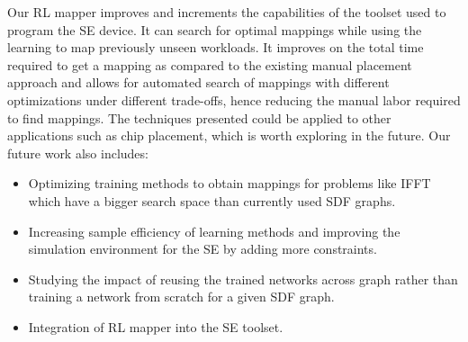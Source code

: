 Our RL mapper improves and increments the capabilities of the toolset used to program the SE device. 
It can search for optimal mappings while using the learning to map previously unseen workloads. 
It improves on the total time required to get a mapping as compared to the existing manual placement approach and allows for automated search of mappings with different optimizations under different trade-offs, hence reducing the manual labor required to find mappings. 
The techniques presented could be applied to other applications such as chip placement, which is worth exploring in the future. 
Our future work also includes: 
\begin{itemize}
    \item Optimizing training methods to obtain mappings for problems like IFFT which have a bigger search space than currently used SDF graphs. 
    \item Increasing sample efficiency of learning methods and improving the simulation environment for the SE by adding more constraints. 
    \item Studying the impact of reusing the trained networks across graph rather than training a network from scratch for a given SDF graph.
    \item Integration of RL mapper into the SE toolset.
\end{itemize}